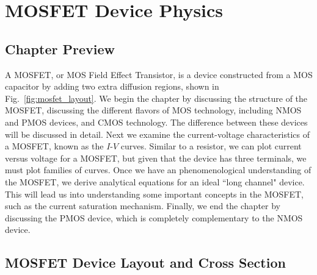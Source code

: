 \chapter{MOSFET Device Physics}
\label{ch:ch08_mos}
\graphicspath{{./figs_mos/}}
\section{Chapter Preview}
A MOSFET, or MOS Field Effect Transistor, is a device constructed from a MOS capacitor by adding two extra diffusion regions, shown in Fig.~\ref{fig:mosfet_layout}.  We begin the chapter by discussing the structure of the MOSFET, discussing the different flavors of MOS technology, including NMOS and PMOS devices, and CMOS technology.  The difference between these devices will be discussed in detail.  Next we examine the current-voltage characteristics of a MOSFET, known as the $I$-$V$ curves.  Similar to a resistor, we can plot current versus voltage for a MOSFET, but given that the device has three terminals, we must plot families of curves.  Once we have an phenomenological understanding of the MOSFET, we derive analytical equations for an ideal ``long channel" device.  This will lead us into understanding some important concepts in the MOSFET, such as the current saturation mechanism.  Finally, we end the chapter by discussing the PMOS device, which is completely complementary to the NMOS device.
\section{MOSFET Device Layout and Cross Section}

